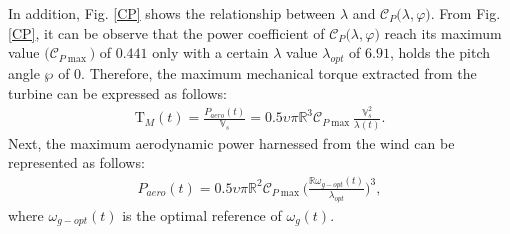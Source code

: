 \documentclass[preprint,11pt]{elsarticle}
\begin{document}
In addition, Fig. \ref{CP} shows the relationship between $\lambda$ and $\mathcal{C}_P\big( {\lambda},\varphi \big)$. From Fig. \ref{CP}, it can be observe that the power coefficient of $\mathcal{C}_P\big( {\lambda},\varphi \big)$ reach its maximum value $\big(\mathcal{C}_{P\max}\big)$ of $0.441$ only with a certain $\lambda$ value $\mathfrak{\lambda}_{opt}$ of $6.91$, holds the pitch angle $\wp$ of $0$. Therefore, the maximum mechanical torque extracted from the turbine can be expressed as follows:
\begin{eqnarray}
\mathrm{T}_{M}(t)=\frac{{P}_{aero}(t)}{\mathbb{V}_{s}}= 0.5 \upsilon\pi  \mathbb{R}^3 \mathcal{C}_{P\max}\frac{\mathbb{V}^2_{s}}{\lambda(t)}.\label{1}
\end{eqnarray}
Next, the maximum aerodynamic power harnessed from the wind can be represented as follows:
\begin{eqnarray*}
{P}_{aero}(t)= 0.5 \upsilon\pi  \mathbb{R}^2 \mathcal{C}_{P\max}\Big( \frac{\mathbb{R}\omega_{g-opt}(t)}{\lambda_{opt}} \Big)^3,
\end{eqnarray*}
where $\omega_{g-opt}(t)$ is the optimal reference of $\omega_{g}(t)$.
\end{document}
